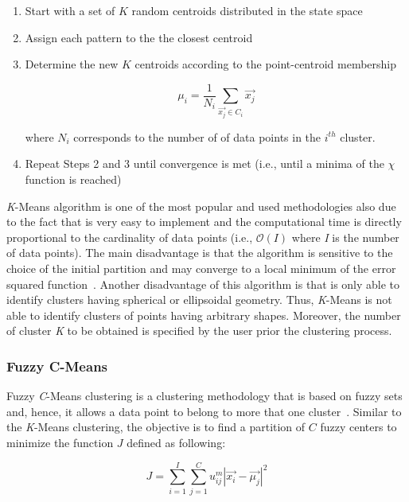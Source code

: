 \begin{enumerate}
  \item Start with a set of $K$ random centroids distributed in the state space
  \item Assign each pattern to the the closest centroid
  \item Determine the new $K$ centroids according to the point-centroid membership

    \begin{equation}
        \mu_{i} = \displaystyle \frac{1}{N_{i}} \sum_{\vec{x_{j}}\in C_{i}} \vec{x_{j}}
    \end{equation}

    where $N_{i}$ corresponds to the number of of data points in the $i^{th}$ cluster.

  \item Repeat Steps 2 and 3 until convergence is met (i.e., until a minima of the $\chi$ function is reached)
\end{enumerate}

\emph{K}-Means algorithm is one of the most popular and used methodologies also due to the fact that is very easy to implement and the computational time is directly proportional to the cardinality of data points (i.e., $\mathcal{O}(I)$ where \emph{I} is the number of data points). The main disadvantage is that the algorithm is sensitive to the choice of the initial partition and may converge to a local minimum of the error squared function~\cite{JainAlgor88}. Another disadvantage of this algorithm is that is only able to identify clusters having spherical or ellipsoidal geometry. Thus, \emph{K}-Means is not able to identify clusters of points having arbitrary shapes. Moreover, the number of cluster \emph{K} to be obtained is specified by the user prior the clustering process.

\subsubsection{Fuzzy C-Means}
\label{FuzzyCMeansn}

Fuzzy \emph{C}-Means clustering is a clustering methodology that is based on fuzzy sets and, hence, it allows a data point to belong to more that one cluster~\cite{FuzzyBezdek,DunnFuzzy}. Similar to the \emph{K}-Means clustering, the objective is to find a partition of $C$ fuzzy centers to minimize the function $J$ defined as following:

\begin{equation}
    J = \displaystyle \sum_{i=1}^I \displaystyle \sum_{j=1}^C u_{ij}^{m}|\vec{x_{i}}-\vec{\mu_{j}}|^{2}
\end{equation}

